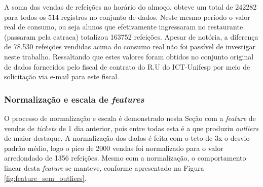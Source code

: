         A soma das vendas de refeições no horário do almoço, obteve um total de 242282 para todos os 514 registros no conjunto de dados. Neste mesmo período o valor real de consumo, ou seja alunos que efetivamente ingressaram no restaurante (passaram pela catraca) totalizou 163752 refeições. Apesar de notória, a diferença de 78.530 refeições vendidas acima do consumo real não foi passível de investigar neste trabalho. Ressaltando que estes valores foram obtidos no conjunto original de dados fornecidos pelo fiscal de contrato do R.U do ICT-Unifesp por meio de solicitação via e-mail para este fiscal.


                    \begin{figure}[!htpb]
                    \end{figure}
                
                
          

            \subsubsection{Normalização e escala de \textit{features}}
            
                O processo de normalização e escala é demonstrado nesta Seção com a \textit{feature} de vendas de \textit{tickets} de 1 dia anterior, pois entre todas esta é a que produziu \textit{outliers} de maior destaque.
                A normalização dos dados é feita com o teto de 3x o desvio padrão médio, logo o pico de 2000 vendas foi normalizado para o valor arredondado de 1356 refeições. Mesmo com a normalização, o comportamento linear desta \textit{feature} se manteve, conforme apresentado na Figura \ref{fig:feature_sem_outliers}. 


